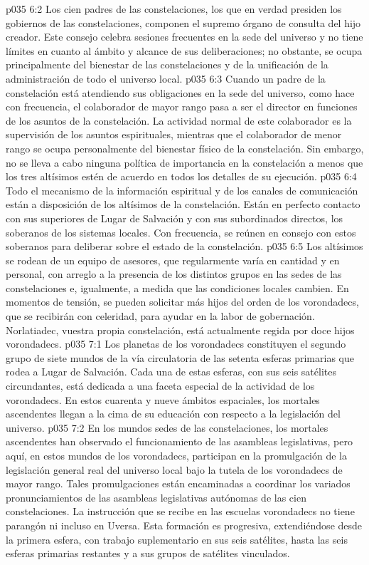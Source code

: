 \vs p035 6:2 Los cien padres de las constelaciones, los que en verdad presiden los gobiernos de las constelaciones, componen el supremo órgano de consulta del hijo creador. Este consejo celebra sesiones frecuentes en la sede del universo y no tiene límites en cuanto al ámbito y alcance de sus deliberaciones; no obstante, se ocupa principalmente del bienestar de las constelaciones y de la unificación de la administración de todo el universo local.
\vs p035 6:3 Cuando un padre de la constelación está atendiendo sus obligaciones en la sede del universo, como hace con frecuencia, el colaborador de mayor rango pasa a ser el director en funciones de los asuntos de la constelación. La actividad normal de este colaborador es la supervisión de los asuntos espirituales, mientras que el colaborador de menor rango se ocupa personalmente del bienestar físico de la constelación. Sin embargo, no se lleva a cabo ninguna política de importancia en la constelación a menos que los tres altísimos estén de acuerdo en todos los detalles de su ejecución.
\vs p035 6:4 Todo el mecanismo de la información espiritual y de los canales de comunicación están a disposición de los altísimos de la constelación. Están en perfecto contacto con sus superiores de Lugar de Salvación y con sus subordinados directos, los soberanos de los sistemas locales. Con frecuencia, se reúnen en consejo con estos soberanos para deliberar sobre el estado de la constelación.
\vs p035 6:5 Los altísimos se rodean de un equipo de asesores, que regularmente varía en cantidad y en personal, con arreglo a la presencia de los distintos grupos en las sedes de las constelaciones e, igualmente, a medida que las condiciones locales cambien. En momentos de tensión, se pueden solicitar más hijos del orden de los vorondadecs, que se recibirán con celeridad, para ayudar en la labor de gobernación. Norlatiadec, vuestra propia constelación, está actualmente regida por doce hijos vorondadecs.
\vs p035 7:1 Los planetas de los vorondadecs constituyen el segundo grupo de siete mundos de la vía circulatoria de las setenta esferas primarias que rodea a Lugar de Salvación. Cada una de estas esferas, con sus seis satélites circundantes, está dedicada a una faceta especial de la actividad de los vorondadecs. En estos cuarenta y nueve ámbitos espaciales, los mortales ascendentes llegan a la cima de su educación con respecto a la legislación del universo.
\vs p035 7:2 En los mundos sedes de las constelaciones, los mortales ascendentes han observado el funcionamiento de las asambleas legislativas, pero aquí, en estos mundos de los vorondadecs, participan en la promulgación de la legislación general real del universo local bajo la tutela de los vorondadecs de mayor rango. Tales promulgaciones están encaminadas a coordinar los variados pronunciamientos de las asambleas legislativas autónomas de las cien constelaciones. La instrucción que se recibe en las escuelas vorondadecs no tiene parangón ni incluso en Uversa. Esta formación es progresiva, extendiéndose desde la primera esfera, con trabajo suplementario en sus seis satélites, hasta las seis esferas primarias restantes y a sus grupos de satélites vinculados.
